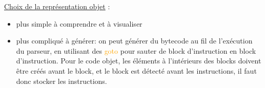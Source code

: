 \documentclass[a4paper]{article}%
\begin{document}
\underline{Choix de la représentation objet} :
\begin{itemize}
\item plus simple à comprendre et à visualiser
\item plus compliqué à générer: on peut générer du bytecode au fil de l'exécution du parseur, en utilisant des \textcolor{orange}{goto} pour sauter de block d'instruction en block d'instruction. Pour le code objet, les éléments à l'intérieurs des blocks doivent être créés avant le block, et le block est détecté avant les instructions, il faut donc stocker les instructions.
\end{itemize}


\clearpage{}%

\printbibliography[keyword={paper},title={Biliographie}]
\printbibliography[keyword={web},title={Webographie}]
\end{document}
